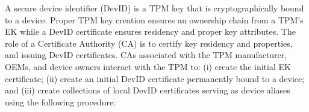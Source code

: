 \documentclass[runningheads]{llncs}
\begin{document}

A secure device identifier (DevID) is a TPM key that is
cryptographically bound to a device. Proper TPM key creation ensures
an ownership chain from a TPM's EK while a DevID certificate ensures
residency and proper key attributes.  The role of a Certificate
Authority (CA) is to certify key residency and properties, and issuing
DevID certificates.  CAs associated with the TPM manufacturer, OEMs,
and device owners interact with the TPM to: (i) create the initial EK
certificate; (ii) create an initial DevID certificate permanently
bound to a device; and (iii) create collections of local DevID
certificates serving as device aliases using the following procedure:


\end{document}
